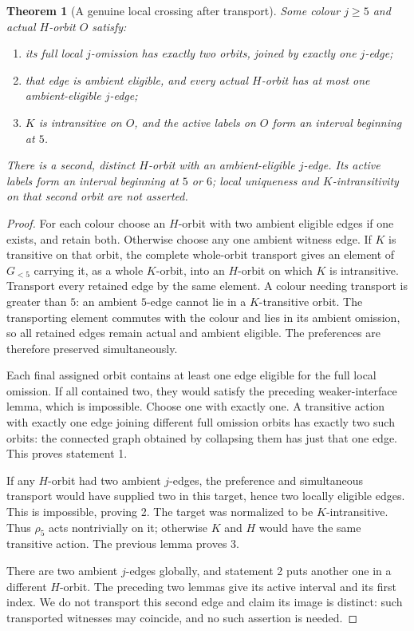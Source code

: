 \documentclass[11pt,a4paper]{article}
\newtheorem{theorem}[lemma]{Theorem}
\begin{document}
\begin{theorem}[A genuine local crossing after transport]
Some colour $j\ge5$ and actual $H$-orbit $O$ satisfy:
\begin{enumerate}
\item its full local $j$-omission has exactly two
      orbits, joined by exactly one $j$-edge;
\item that edge is ambient eligible, and every
      actual $H$-orbit has at most one ambient-eligible
      $j$-edge;
\item $K$ is intransitive on $O$, and the active
      labels on $O$ form an interval beginning at $5$.
\end{enumerate}
There is a second, distinct $H$-orbit with an
ambient-eligible $j$-edge. Its active labels form
an interval beginning at $5$ or $6$; local
uniqueness and $K$-intransitivity on that second
orbit are not asserted.
\end{theorem}
\begin{proof}
For each colour choose an $H$-orbit with two ambient
eligible edges if one exists, and retain both.
Otherwise choose any one ambient witness edge.
If $K$ is transitive on that orbit, the complete
whole-orbit transport gives an element of $G_{<5}$
carrying it, as a whole $K$-orbit, into an $H$-orbit
on which $K$ is intransitive. Transport every retained
edge by the same element. A colour needing transport
is greater than $5$: an ambient $5$-edge cannot
lie in a $K$-transitive orbit. The transporting
element commutes with the colour and lies in its
ambient omission, so all retained edges remain
actual and ambient eligible. The preferences are
therefore preserved simultaneously.

Each final assigned orbit contains at least one
edge eligible for the full local omission. If all
contained two, they would satisfy the preceding
weaker-interface lemma, which is impossible.
Choose one with exactly one. A transitive action
with exactly one edge joining different full
omission orbits has exactly two such orbits:
the connected graph obtained by collapsing them
has just that one edge. This proves statement 1.

If any $H$-orbit had two ambient $j$-edges, the
preference and simultaneous transport would have
supplied two in this target, hence two locally
eligible edges. This is impossible, proving 2.
The target was normalized to be $K$-intransitive.
Thus $\rho_5$ acts nontrivially on it; otherwise
$K$ and $H$ would have the same transitive action.
The previous lemma proves 3.

There are two ambient $j$-edges globally, and
statement 2 puts another one in a different
$H$-orbit. The preceding two lemmas give its
active interval and its first index. We do not
transport this second edge and claim its image
is distinct: such transported witnesses may
coincide, and no such assertion is needed.
\end{proof}
\end{document}
